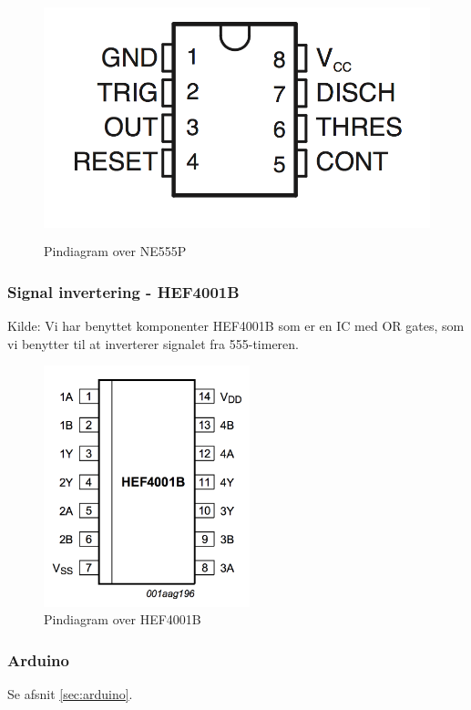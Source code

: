 \begin{figure}[H]
	\centering
    \includegraphics[height=7cm]{figures/2_4_4hastighedsmaal/komp555pin.png}
	\caption{Pindiagram over NE555P}
	\label{fig:komp555pin}
\end{figure}

\subsubsection{Signal invertering - HEF4001B}
Kilde: \cite{kompInverter}
Vi har benyttet komponenter HEF4001B som er en IC med OR gates, som vi benytter til at inverterer signalet fra 555-timeren.



\begin{figure}[H]
	\centering
    \includegraphics[height=7cm]{figures/2_4_4hastighedsmaal/kompInverterpin.png}
	\caption{Pindiagram over HEF4001B}
	\label{fig:kompInverter}
\end{figure}


\subsubsection{Arduino}
Se afsnit \ref{sec:arduino}.

